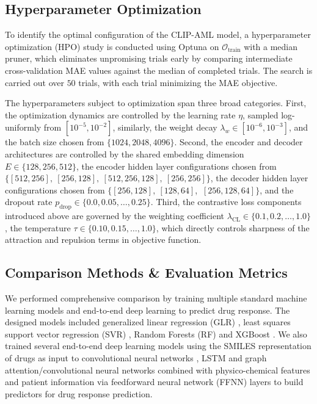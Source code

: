 \documentclass[sigconf,authordraft]{acmart}
\begin{document}
\subsection{Hyperparameter Optimization}
To identify the optimal configuration of the CLIP-AML model, a hyperparameter optimization (HPO) study is conducted using Optuna \cite{akiba2019optuna} on $\mathcal{O}_{\text{train}}$ with a median pruner, which eliminates unpromising trials early by comparing intermediate cross-validation MAE values against the median of completed trials. The search is carried out over $50$ trials, with each trial minimizing the MAE objective. 

The hyperparameters subject to optimization span three broad categories. First, the optimization dynamics are controlled by the learning rate $\eta$, sampled log-uniformly from $[10^{-5}, 10^{-2}]$, similarly, the weight decay $\lambda_w \in [10^{-6}, 10^{-3}]$, and the batch size chosen from $\{1024, 2048, 4096\}$. Second, the encoder and decoder architectures are controlled by the shared embedding dimension $E \in \{128, 256, 512\}$, the encoder hidden layer configurations chosen from $\{[512, 256],\ [256, 128],\ [512, 256, 128],\ [256, 256]\}$, the decoder hidden layer configurations chosen from $\{[256, 128],\ [128, 64]$, $\ [256, 128, 64]\}$, and the dropout rate $p_{\text{drop}} \in \{0.0, 0.05, \ldots, 0.25\}$. Third, the contrastive loss components introduced above are governed by the weighting coefficient $\lambda_{\text{CL}} \in \{0.1, 0.2, \ldots, 1.0\}$, the temperature $\tau \in \{0.10, 0.15, \ldots, 1.0\}$, which directly controls sharpness of the attraction and repulsion terms in objective function.
\subsection{Comparison Methods \& Evaluation Metrics}
We performed comprehensive comparison by training multiple standard machine learning models and end-to-end deep learning to predict drug response. The designed models included generalized linear regression (GLR) \cite{nelder1972generalized}, least squares support vector regression (SVR) \cite{suykens1999least,mall2015very}, Random Forests
(RF) \cite{breiman2001random} and XGBoost \cite{chen2016xgboost}. We also trained several end-to-end deep learning models using the SMILES representation of drugs as input to convolutional
neural networks \cite{lecun2015deep}, LSTM \cite{gers2000learning} and graph attention/convolutional neural networks \cite{velivckovic2017graph} combined with physico-chemical features and patient information via feedforward neural network (FFNN) layers to build predictors for drug response prediction.
\end{document}
